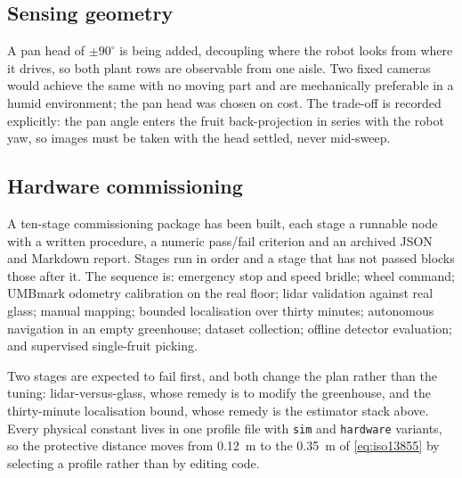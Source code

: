 \documentclass[conference]{IEEEtran}
\begin{document}
\subsection{Sensing geometry}

A pan head of $\pm 90^\circ$ is being added, decoupling where the robot looks
from where it drives, so both plant rows are observable from one aisle. Two
fixed cameras would achieve the same with no moving part and are mechanically
preferable in a humid environment; the pan head was chosen on cost. The
trade-off is recorded explicitly: the pan angle enters the fruit
back-projection in series with the robot yaw, so images must be taken with the
head settled, never mid-sweep.

\subsection{Hardware commissioning}

A ten-stage commissioning package has been built, each stage a runnable node
with a written procedure, a numeric pass/fail criterion and an archived JSON
and Markdown report. Stages run in order and a stage that has not passed
blocks those after it. The sequence is: emergency stop and speed bridle;
wheel command; UMBmark odometry calibration \cite{borenstein1996umbmark} on
the real floor; lidar validation against real glass; manual mapping; bounded
localisation over thirty minutes; autonomous navigation in an empty
greenhouse; dataset collection; offline detector evaluation; and supervised
single-fruit picking.

Two stages are expected to fail first, and both change the plan rather than
the tuning: lidar-versus-glass, whose remedy is to modify the greenhouse, and
the thirty-minute localisation bound, whose remedy is the estimator stack
above. Every physical constant lives in one profile file with \texttt{sim} and
\texttt{hardware} variants, so the protective distance moves from
\SI{0.12}{m} to the \SI{0.35}{m} of \eqref{eq:iso13855} by selecting a
profile rather than by editing code.
\end{document}
